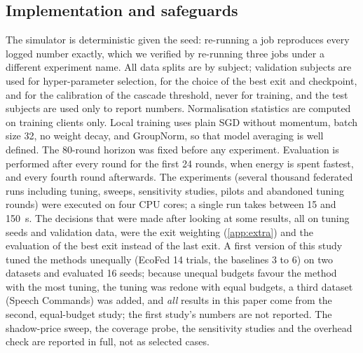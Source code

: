 \subsection{Implementation and safeguards}
The simulator is deterministic given the seed: re-running a job reproduces every logged number exactly, which we verified by re-running three jobs under a different experiment name. All data splits are by subject; validation subjects are used for hyper-parameter selection, for the choice of the best exit and checkpoint, and for the calibration of the cascade threshold, never for training, and the test subjects are used only to report numbers. Normalisation statistics are computed on training clients only. Local training uses plain SGD without momentum, batch size 32, no weight decay, and GroupNorm, so that model averaging is well defined. The 80-round horizon was fixed before any experiment. Evaluation is performed after every round for the first 24 rounds, when energy is spent fastest, and every fourth round afterwards. The experiments (several thousand federated runs including tuning, sweeps, sensitivity studies, pilots and abandoned tuning rounds) were executed on four CPU cores; a single run takes between 15 and 150~s. The decisions that were made after looking at some results, all on tuning seeds and validation data, were the exit weighting (\ref{app:extra}) and the evaluation of the best exit instead of the last exit. A first version of this study tuned the methods unequally (EcoFed 14 trials, the baselines 3 to 6) on two datasets and evaluated 16 seeds; because unequal budgets favour the method with the most tuning, the tuning was redone with equal budgets, a third dataset (Speech Commands) was added, and \emph{all} results in this paper come from the second, equal-budget study; the first study's numbers are not reported. The shadow-price sweep, the coverage probe, the sensitivity studies and the overhead check are reported in full, not as selected cases.
